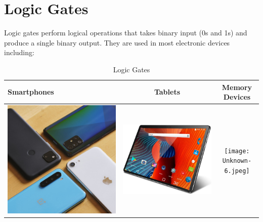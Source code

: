 \documentclass{article}
\begin{document}
	\section{Logic Gates}
	Logic gates perform logical operations that takes binary input (0s and 1s) and produce a single binary output.
	They are used in most electronic devices including:
	\begin{table}[h!]
		\begin{center}
			\caption{Logic Gates}
			\label{tab:Table 1}
			\begin{tabular}{|l|c|c|}
				\hline
				Smartphones
				&
				Tablets & Memory Devices\\
				\hline
				\includegraphics[width=0.2\linewidth]{vpavic_200805_4131_0086_1.jpg}
				&
				\includegraphics[width=0.25\linewidth]{productimg.jpeg}
				&
				\texttt{[image: Unknown-6.jpeg]}\\
				\hline
			\end{tabular}
				
		\end{center}
		
		
	\end{table}
	
\end{document}
